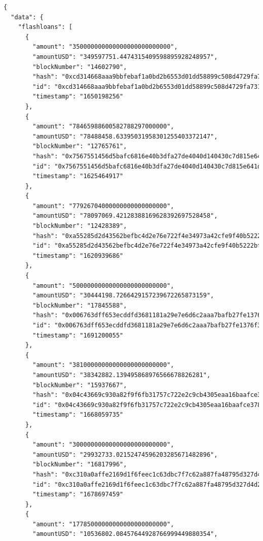 \documentclass[11pt,a4paper,titlepage]{scrartcl}
\begin{document}
\begin{lstlisting}[language=xml, caption={ JSON response for top 10 usd amount flashloans}, label={lst:fl_topten_rsp}, basicstyle=\ttfamily\scriptsize]
{
  "data": {
    "flashloans": [
      {
        "amount": "350000000000000000000000000",
        "amountUSD": "349597751.4474315409598895928248957",
        "blockNumber": "14602790",
        "hash": "0xcd314668aaa9bbfebaf1a0bd2b6553d01dd58899c508d4729fa7311dc5d33ad7",
        "id": "0xcd314668aaa9bbfebaf1a0bd2b6553d01dd58899c508d4729fa7311dc5d33ad76900000006000000",
        "timestamp": "1650198256"
      },
      {
        "amount": "78465988600582788297000000",
        "amountUSD": "78488458.63395031958301255403372147",
        "blockNumber": "12765761",
        "hash": "0x7567551456d5bafc6816e40b3dfa27de4040d140430c7d815e641d301755fb0b",
        "id": "0x7567551456d5bafc6816e40b3dfa27de4040d140430c7d815e641d301755fb0b3001000006000000",
        "timestamp": "1625464917"
      },
      {
        "amount": "77926704000000000000000000",
        "amountUSD": "78097069.42128388169628392697528458",
        "blockNumber": "12428389",
        "hash": "0xa55285d2d43562befbc4d2e76e722f4e34973a42cfe9f40b5222bf0f68bb8841",
        "id": "0xa55285d2d43562befbc4d2e76e722f4e34973a42cfe9f40b5222bf0f68bb8841a500000006000000",
        "timestamp": "1620939686"
      },
      {
        "amount": "50000000000000000000000000",
        "amountUSD": "30444198.7266429157239672265873159",
        "blockNumber": "17845588",
        "hash": "0x006763dff653ecddfd3681181a29e7e6d6c2aaa7bafb27fe1376f3f7ce367c1e",
        "id": "0x006763dff653ecddfd3681181a29e7e6d6c2aaa7bafb27fe1376f3f7ce367c1ea102000006000000",
        "timestamp": "1691200055"
      },
      {
        "amount": "38100000000000000000000000",
        "amountUSD": "38342882.139495868976566678826281",
        "blockNumber": "15937667",
        "hash": "0x04c43669c930a82f9f6fb31757c722e2c9cb4305eaa16baafce378aa1c09e98e",
        "id": "0x04c43669c930a82f9f6fb31757c722e2c9cb4305eaa16baafce378aa1c09e98e1000000006000000",
        "timestamp": "1668059735"
      },
      {
        "amount": "30000000000000000000000000",
        "amountUSD": "29932733.02152474596203285671482896",
        "blockNumber": "16817996",
        "hash": "0xc310a0affe2169d1f6feec1c63dbc7f7c62a887fa48795d327d4d2da2d6b111d",
        "id": "0xc310a0affe2169d1f6feec1c63dbc7f7c62a887fa48795d327d4d2da2d6b111d3700000006000000",
        "timestamp": "1678697459"
      },
      {
        "amount": "17785000000000000000000000",
        "amountUSD": "10536802.08457644928766999449880354",

\end{lstlisting}
\end{document}

